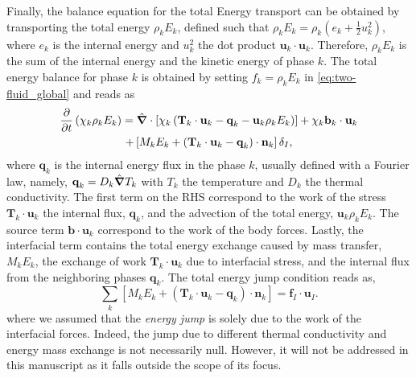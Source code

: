 Finally, the balance equation for the total Energy transport can be obtained by transporting the total energy $\rho_k E_k$, defined such that $\rho_k E_k = \rho_k(e_k + \frac{1}{2}u_k^2)$, 
where $e_k$ is the internal energy and $u_k^2$ the dot product $\textbf{u}_k\cdot\textbf{u}_k$.
Therefore, $\rho_k E_k$ is the sum of the internal energy and the kinetic energy of phase $k$.
The total energy balance for phase $k$ is obtained by setting $f_k = \rho_k E_k$ in \ref{eq:two-fluid_global} and reads as
\begin{multline}
    \frac{\partial}{\partial t} \left(
        \chi_k \rho_k E_k
    \right)
    = \hat{\bm{\nabla}} \cdot \left[
        \chi_k\left(
            \textbf{T}_k\cdot\textbf{u}_k
            - \textbf{q}_k
            - \textbf{u}_k \rho_k E_k 
        \right)
    \right]
    + \chi_k\textbf{b}_k\cdot\textbf{u}_k\\
    +\left[
        M_k E_k
        + \left(
        \textbf{T}_k\cdot\textbf{u}_k
        - \textbf{q}_k
        \right) 
        \cdot\textbf{n}_k   
    \right]\delta_I,
    \label{eq:two-fuild_totenergy}
\end{multline}
where $\textbf{q}_k$ is the internal energy flux in the phase $k$, usually defined with a Fourier 
law, namely, $\textbf{q}_k = D_k\hat{\bm{\nabla}} T_k$ with $T_k$ the temperature and $D_k$ the thermal 
conductivity. 
The first term on the RHS correspond to the work of the stress $\textbf{T}_k\cdot \textbf{u}_k$ the internal flux, $\textbf{q}_k$,  and the advection of the total energy, $\textbf{u}_k \rho_k E_k$. 
The source term $\textbf{b}\cdot\textbf{u}_k$ correspond to the work of the body forces. 
Lastly, the interfacial term contains the total energy exchange caused by mass transfer, $M_k E_k$, the exchange of work $\textbf{T}_k\cdot\textbf{u}_k$ due to interfacial stress, and the internal flux from the neighboring phases $\textbf{q}_k$.   
The total energy jump condition reads as, 
\begin{equation}
    \sum_k \left[
        M_k E_k
        + \left(
            \textbf{T}_k \cdot \textbf{u}_k
            - \textbf{q}_k 
        \right)
        \cdot \textbf{n}_k
    \right]
    = \textbf{f}_I\cdot\textbf{u}_I.
    \label{eq:total_energy_jump}
\end{equation}
where we assumed that the \textit{energy jump} is solely due to the work of the interfacial forces. 
Indeed, the jump due to different thermal conductivity and energy mass exchange is not necessarily null. 
However, it will not be addressed in this manuscript as it falls outside the scope of its focus. 

